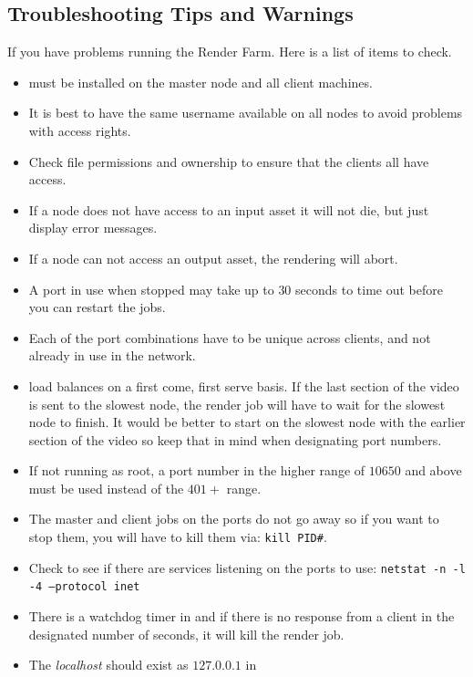 \subsection{Troubleshooting Tips and Warnings}%
\label{sub:troubleshhoting_tips_warnings}

\noindent If you have problems running the Render Farm.  Here is a
list of items to check.

\begin{itemize}
\item \CGG{} must be installed on the master node and all client
  machines.
\item It is best to have the same username available on all nodes to
  avoid problems with access rights.
\item Check file permissions and ownership to ensure that the
  clients all have access.
\item If a node does not have access to an input asset it will not
  die, but just display error messages.
\item If a node can not access an output asset, the rendering will
  abort.
\item A port in use when stopped may take up to $30$ seconds to time
  out before you can restart the jobs.
\item Each of the port combinations have to be unique across
  clients, and not already in use in the network.
\item \CGG{} load balances on a first come, first serve basis.  If
  the last section of the video is sent to the slowest node, the
  render job will have to wait for the slowest node to finish.  It
  would be better to start on the slowest node with the earlier
  section of the video so keep that in mind when designating port
  numbers.
\item If not running as root, a port number in the higher range of
  $10650$ and above must be used instead of the $401+$ range.
\item The master and client jobs on the ports do not go away so if
  you want to stop them, you will have to kill them via: \texttt{kill
    PID\#}.
\item Check to see if there are services listening on the ports to
  use: \texttt{netstat -n -l -4 --protocol inet}
\item There is a watchdog timer in \CGG{} and if there is no
  response from a client in the designated number of seconds, it will
  kill the render job.
\item The \textit{localhost} should exist as $127.0.0.1$ in

\end{itemize}
